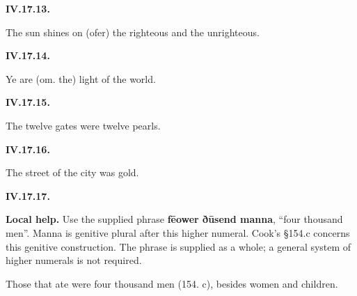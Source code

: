 \par\begin{minipage}{\linewidth}\raggedright
\textbf{IV.17.13.}

The sun shines on (ofer) the righteous and the unrighteous.

\end{minipage}\par\addvspace{4pt}

\par\begin{minipage}{\linewidth}\raggedright
\textbf{IV.17.14.}

Ye are (om. the) light of the world.

\end{minipage}\par\addvspace{4pt}

\par\begin{minipage}{\linewidth}\raggedright
\textbf{IV.17.15.}

The twelve gates were twelve pearls.

\end{minipage}\par\addvspace{4pt}

\par\begin{minipage}{\linewidth}\raggedright
\textbf{IV.17.16.}

The street of the city was gold.

\end{minipage}\par\addvspace{4pt}

\par\begin{minipage}{\linewidth}\raggedright
\textbf{IV.17.17.}

\textbf{Local help.} Use the supplied phrase \textbf{fēower ðūsend manna}, “four thousand men”. Manna is genitive plural after this higher numeral. Cook’s §154.c concerns this genitive construction. The phrase is supplied as a whole; a general system of higher numerals is not required.

Those that ate were four thousand men (154. c), besides women and children.

\end{minipage}\par\addvspace{4pt}

